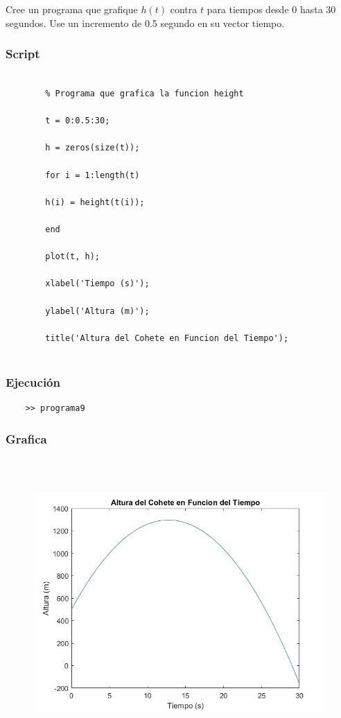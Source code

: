 \documentclass{article}
\begin{document}
	\newpage
	Cree un programa que grafique $h(t)$ contra $t$ para tiempos desde 0 hasta 30 segundos. Use un incremento de 0.5 segundo en su vector tiempo.
	
	\subsubsection{Script}
	
	\begin{lstlisting}
		
		% Programa que grafica la funcion height
		
		t = 0:0.5:30;
		
		h = zeros(size(t));
		
		for i = 1:length(t)
		
		h(i) = height(t(i));
		
		end
		
		plot(t, h);
		
		xlabel('Tiempo (s)');
		
		ylabel('Altura (m)');
		
		title('Altura del Cohete en Funcion del Tiempo');
		
	\end{lstlisting}
	
	\subsubsection{Ejecución}
	
	\begin{lstlisting}
	>> programa9
	\end{lstlisting}
	
	\subsubsection{Grafica}
	
	\begin{figure}[H]
		\centering
		\includegraphics[height=11cm]{img9.jpg}
	\end{figure}
	
\end{document}
